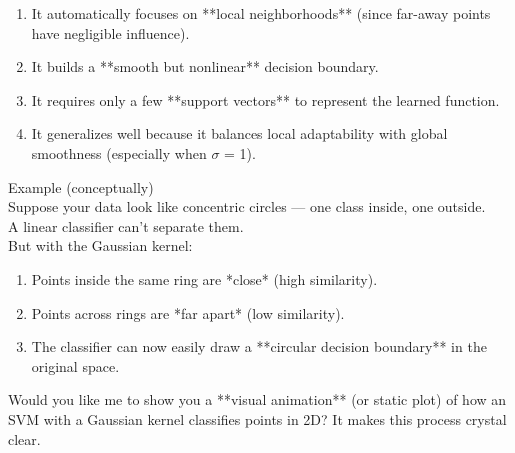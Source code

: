 \documentclass[12pt]{article}
\begin{document}
\begin{enumerate}
  \item It automatically focuses on **local neighborhoods** (since far-away points have negligible influence).
  \item It builds a **smooth but nonlinear** decision boundary.
  \item It requires only a few **support vectors** to represent the learned function.
  \item It generalizes well because it balances local adaptability with global smoothness (especially when $\sigma$ = 1).
\end{enumerate}
Example (conceptually) \\
Suppose your data look like concentric circles — one class inside, one outside. \\
A linear classifier can't separate them.\\
But with the Gaussian kernel: \\
\begin{enumerate}
  \item Points inside the same ring are *close* (high similarity).
  \item Points across rings are *far apart* (low similarity).
  \item The classifier can now easily draw a **circular decision boundary** in the original space.
\end{enumerate}
Would you like me to show you a **visual animation** (or static plot) of how an SVM with a Gaussian kernel classifies points in 2D? It makes this process crystal clear.
\end{document}
